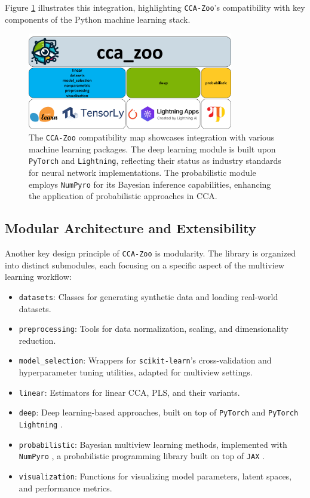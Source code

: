 Figure \ref{fig:cca-zoo-api} illustrates this integration, highlighting \texttt{CCA-Zoo}'s compatibility with key components of the Python machine learning stack.

\begin{figure}[ht]
\centering
\includegraphics[width=0.8\textwidth]{figures/CCA_Zoo_map}
\caption[The \texttt{CCA-Zoo} compatibility map]{The \texttt{CCA-Zoo} compatibility map showcases integration with various machine learning packages. The deep learning module is built upon \texttt{PyTorch} and \texttt{Lightning}, reflecting their status as industry standards for neural network implementations. The probabilistic module employs \texttt{NumPyro} for its Bayesian inference capabilities, enhancing the application of probabilistic approaches in CCA.}
\label{fig:cca-zoo-api}
\end{figure}

\subsection{Modular Architecture and Extensibility}

Another key design principle of \texttt{CCA-Zoo} is modularity. The library is organized into distinct submodules, each focusing on a specific aspect of the multiview learning workflow:

\begin{itemize}
\item \texttt{datasets}: Classes for generating synthetic data and loading real-world datasets.
\item \texttt{preprocessing}: Tools for data normalization, scaling, and dimensionality reduction.
\item \texttt{model\_selection}: Wrappers for \texttt{scikit-learn}'s cross-validation and hyperparameter tuning utilities, adapted for multiview settings.
\item \texttt{linear}: Estimators for linear CCA, PLS, and their variants.
\item \texttt{deep}: Deep learning-based approaches, built on top of \texttt{PyTorch} \citep{paszke2019pytorch} and \texttt{PyTorch Lightning} \citep{falcon2019pytorch}.
\item \texttt{probabilistic}: Bayesian multiview learning methods, implemented with \texttt{NumPyro} \citep{phan2019composable}, a probabilistic programming library built on top of \texttt{JAX} \citep{deepmind2020jax}.
\item \texttt{visualization}: Functions for visualizing model parameters, latent spaces, and performance metrics.
\end{itemize}

